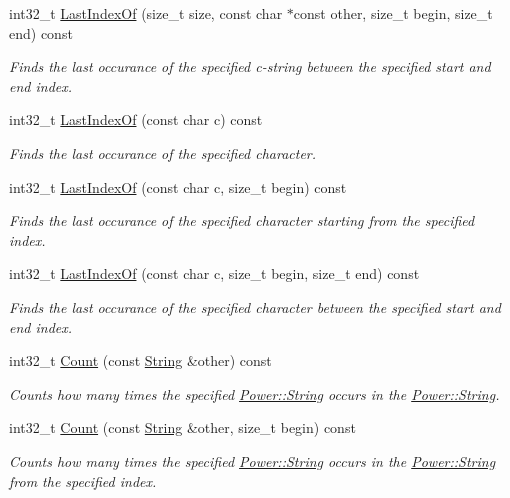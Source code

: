 \begin{DoxyCompactItemize}
int32\+\_\+t \hyperlink{class_power_1_1_string_aabd73825f8e1cde230ee5659b6df3ad3}{Last\+Index\+Of} (size\+\_\+t size, const char $\ast$const other, size\+\_\+t begin, size\+\_\+t end) const
\begin{DoxyCompactList}\small\item\em Finds the last occurance of the specified c-\/string between the specified start and end index. \end{DoxyCompactList}\item 
int32\+\_\+t \hyperlink{class_power_1_1_string_ad4c89be895074a3f2ad0b67d7747e1c8}{Last\+Index\+Of} (const char c) const
\begin{DoxyCompactList}\small\item\em Finds the last occurance of the specified character. \end{DoxyCompactList}\item 
int32\+\_\+t \hyperlink{class_power_1_1_string_af008e7df0491da29a1fd68a91de61e28}{Last\+Index\+Of} (const char c, size\+\_\+t begin) const
\begin{DoxyCompactList}\small\item\em Finds the last occurance of the specified character starting from the specified index. \end{DoxyCompactList}\item 
int32\+\_\+t \hyperlink{class_power_1_1_string_a0d78f3b4b1bc3b91cb1fc41012577400}{Last\+Index\+Of} (const char c, size\+\_\+t begin, size\+\_\+t end) const
\begin{DoxyCompactList}\small\item\em Finds the last occurance of the specified character between the specified start and end index. \end{DoxyCompactList}\item 
int32\+\_\+t \hyperlink{class_power_1_1_string_ae51f13a94d5335930025256fe1898bad}{Count} (const \hyperlink{class_power_1_1_string}{String} \&other) const
\begin{DoxyCompactList}\small\item\em Counts how many times the specified \hyperlink{class_power_1_1_string}{Power\+::\+String} occurs in the \hyperlink{class_power_1_1_string}{Power\+::\+String}. \end{DoxyCompactList}\item 
int32\+\_\+t \hyperlink{class_power_1_1_string_a28f6ec0778012f430557541f1f0ae8f4}{Count} (const \hyperlink{class_power_1_1_string}{String} \&other, size\+\_\+t begin) const
\begin{DoxyCompactList}\small\item\em Counts how many times the specified \hyperlink{class_power_1_1_string}{Power\+::\+String} occurs in the \hyperlink{class_power_1_1_string}{Power\+::\+String} from the specified index. \end{DoxyCompactList}\item 

\end{DoxyCompactItemize}
